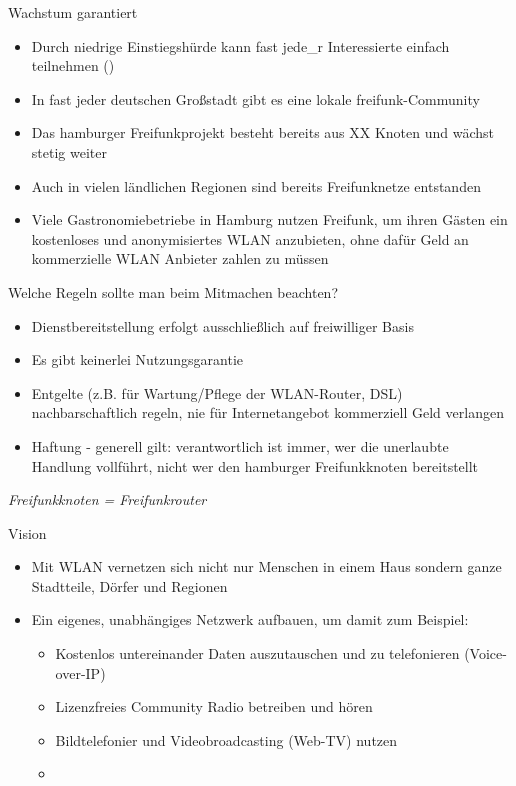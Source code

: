 \documentclass[aspectratio=43]{beamer}
\begin{document}
\begin{frame}{Wachstum garantiert}
	\begin{itemize}
		\item Durch niedrige Einstiegshürde kann fast jede\_r Interessierte einfach teilnehmen ()
		\item In fast jeder deutschen Großstadt gibt es eine lokale freifunk-Community
		\item Das hamburger Freifunkprojekt besteht bereits aus XX Knoten und wächst stetig weiter %
		\item Auch in vielen ländlichen Regionen sind bereits Freifunknetze entstanden
		\item Viele Gastronomiebetriebe in Hamburg nutzen Freifunk, um ihren Gästen ein kostenloses und anonymisiertes WLAN anzubieten, ohne dafür Geld an kommerzielle WLAN Anbieter zahlen zu müssen %
	\end{itemize}
\end{frame}

\begin{frame}{Welche Regeln sollte man beim Mitmachen beachten?}
	\begin{itemize}
		\item Dienstbereitstellung erfolgt ausschließlich auf freiwilliger Basis
		\item Es gibt keinerlei Nutzungsgarantie
		\item Entgelte (z.B. für Wartung/Pflege der WLAN-Router, DSL) nachbarschaftlich regeln, nie für Internetangebot kommerziell Geld verlangen
		\item Haftung - generell gilt: verantwortlich ist immer, wer die unerlaubte Handlung vollführt, nicht wer den hamburger Freifunkknoten bereitstellt
	\end{itemize}
	\it{Freifunkknoten = Freifunkrouter} %
\end{frame}

\begin{frame}{Vision}
	\begin{itemize}
		\item Mit WLAN vernetzen sich nicht nur Menschen in einem Haus sondern ganze Stadtteile, Dörfer und Regionen %
		\item Ein eigenes, unabhängiges Netzwerk aufbauen, um damit zum Beispiel:
		\begin{itemize}
			\item Kostenlos untereinander Daten auszutauschen und zu telefonieren (Voice-over-IP)
			\item Lizenzfreies Community Radio betreiben und hören
			\item Bildtelefonier und Videobroadcasting (Web-TV) nutzen %
			\item <deine Idee hier> %
		\end{itemize}
	\end{itemize}
\end{frame}
\end{document}
